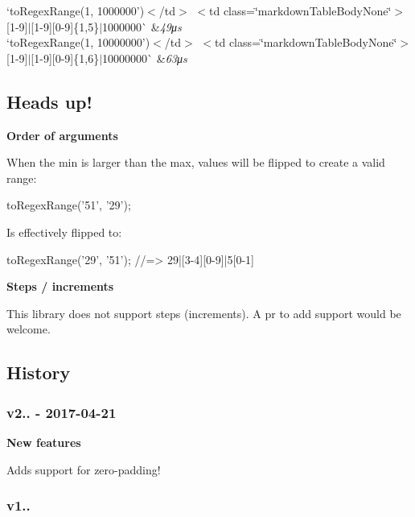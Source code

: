 \begin{longtabu}
`to\+Regex\+Range(\textquotesingle{}1, 1000000'){\ttfamily $<$/td$>$ $<$td class=\char`\"{}markdown\+Table\+Body\+None\char`\"{}$>$}\mbox{[}1-\/9\mbox{]}$|$\mbox{[}1-\/9\mbox{]}\mbox{[}0-\/9\mbox{]}\{1,5\}$|$1000000\`{}  &{\itshape 49μs}   \\
`to\+Regex\+Range(\textquotesingle{}1, 10000000'){\ttfamily $<$/td$>$ $<$td class=\char`\"{}markdown\+Table\+Body\+None\char`\"{}$>$}\mbox{[}1-\/9\mbox{]}$|$\mbox{[}1-\/9\mbox{]}\mbox{[}0-\/9\mbox{]}\{1,6\}$|$10000000\`{}  &{\itshape 63μs}   \\
\end{longtabu}


\subsection*{Heads up!}

{\bfseries Order of arguments}

When the {\ttfamily min} is larger than the {\ttfamily max}, values will be flipped to create a valid range\+:


\begin{DoxyCode}
toRegexRange('51', '29');
\end{DoxyCode}


Is effectively flipped to\+:


\begin{DoxyCode}
toRegexRange('29', '51');
//=> 29|[3-4][0-9]|5[0-1]
\end{DoxyCode}


{\bfseries Steps / increments}

This library does not support steps (increments). A pr to add support would be welcome.

\subsection*{History}

\subsubsection*{v2.. -\/ 2017-\/04-\/21}

{\bfseries New features}

Adds support for zero-\/padding!

\subsubsection*{v1..}


